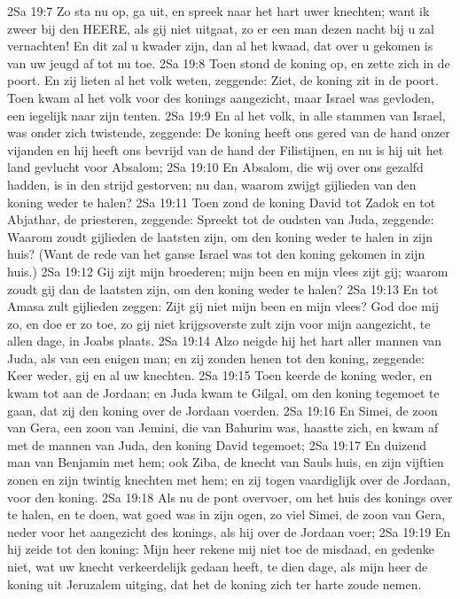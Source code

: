 2Sa 19:7  Zo sta nu op, ga uit, en spreek naar het hart uwer knechten; want ik zweer bij den HEERE, als gij niet uitgaat, zo er een man dezen nacht bij u zal vernachten! En dit zal u kwader zijn, dan al het kwaad, dat over u gekomen is van uw jeugd af tot nu toe.
2Sa 19:8  Toen stond de koning op, en zette zich in de poort. En zij lieten al het volk weten, zeggende: Ziet, de koning zit in de poort. Toen kwam al het volk voor des konings aangezicht, maar Israel was gevloden, een iegelijk naar zijn tenten.
2Sa 19:9  En al het volk, in alle stammen van Israel, was onder zich twistende, zeggende: De koning heeft ons gered van de hand onzer vijanden en hij heeft ons bevrijd van de hand der Filistijnen, en nu is hij uit het land gevlucht voor Absalom;
2Sa 19:10  En Absalom, die wij over ons gezalfd hadden, is in den strijd gestorven; nu dan, waarom zwijgt gijlieden van den koning weder te halen?
2Sa 19:11  Toen zond de koning David tot Zadok en tot Abjathar, de priesteren, zeggende: Spreekt tot de oudsten van Juda, zeggende: Waarom zoudt gijlieden de laatsten zijn, om den koning weder te halen in zijn huis? (Want de rede van het ganse Israel was tot den koning gekomen in zijn huis.)
2Sa 19:12  Gij zijt mijn broederen; mijn been en mijn vlees zijt gij; waarom zoudt gij dan de laatsten zijn, om den koning weder te halen?
2Sa 19:13  En tot Amasa zult gijlieden zeggen: Zijt gij niet mijn been en mijn vlees? God doe mij zo, en doe er zo toe, zo gij niet krijgsoverste zult zijn voor mijn aangezicht, te allen dage, in Joabs plaats.
2Sa 19:14  Alzo neigde hij het hart aller mannen van Juda, als van een enigen man; en zij zonden henen tot den koning, zeggende: Keer weder, gij en al uw knechten.
2Sa 19:15  Toen keerde de koning weder, en kwam tot aan de Jordaan; en Juda kwam te Gilgal, om den koning tegemoet te gaan, dat zij den koning over de Jordaan voerden.
2Sa 19:16  En Simei, de zoon van Gera, een zoon van Jemini, die van Bahurim was, haastte zich, en kwam af met de mannen van Juda, den koning David tegemoet;
2Sa 19:17  En duizend man van Benjamin met hem; ook Ziba, de knecht van Sauls huis, en zijn vijftien zonen en zijn twintig knechten met hem; en zij togen vaardiglijk over de Jordaan, voor den koning.
2Sa 19:18  Als nu de pont overvoer, om het huis des konings over te halen, en te doen, wat goed was in zijn ogen, zo viel Simei, de zoon van Gera, neder voor het aangezicht des konings, als hij over de Jordaan voer;
2Sa 19:19  En hij zeide tot den koning: Mijn heer rekene mij niet toe de misdaad, en gedenke niet, wat uw knecht verkeerdelijk gedaan heeft, te dien dage, als mijn heer de koning uit Jeruzalem uitging, dat het de koning zich ter harte zoude nemen.
